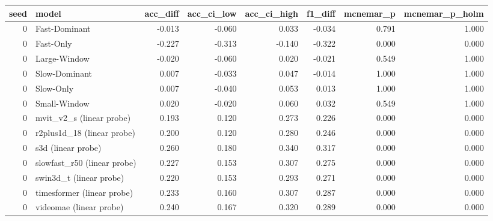 \begin{tabular}{rlrrrrrr}
\toprule
seed & model & acc_diff & acc_ci_low & acc_ci_high & f1_diff & mcnemar_p & mcnemar_p_holm \\
\midrule
0 & Fast-Dominant & -0.013 & -0.060 & 0.033 & -0.034 & 0.791 & 1.000 \\
0 & Fast-Only & -0.227 & -0.313 & -0.140 & -0.322 & 0.000 & 0.000 \\
0 & Large-Window & -0.020 & -0.060 & 0.020 & -0.021 & 0.549 & 1.000 \\
0 & Slow-Dominant & 0.007 & -0.033 & 0.047 & -0.014 & 1.000 & 1.000 \\
0 & Slow-Only & 0.007 & -0.040 & 0.053 & 0.013 & 1.000 & 1.000 \\
0 & Small-Window & 0.020 & -0.020 & 0.060 & 0.032 & 0.549 & 1.000 \\
0 & mvit_v2_s (linear probe) & 0.193 & 0.120 & 0.273 & 0.226 & 0.000 & 0.000 \\
0 & r2plus1d_18 (linear probe) & 0.200 & 0.120 & 0.280 & 0.246 & 0.000 & 0.000 \\
0 & s3d (linear probe) & 0.260 & 0.180 & 0.340 & 0.317 & 0.000 & 0.000 \\
0 & slowfast_r50 (linear probe) & 0.227 & 0.153 & 0.307 & 0.275 & 0.000 & 0.000 \\
0 & swin3d_t (linear probe) & 0.220 & 0.153 & 0.293 & 0.271 & 0.000 & 0.000 \\
0 & timesformer (linear probe) & 0.233 & 0.160 & 0.307 & 0.287 & 0.000 & 0.000 \\
0 & videomae (linear probe) & 0.240 & 0.167 & 0.320 & 0.289 & 0.000 & 0.000 \\
\bottomrule
\end{tabular}
